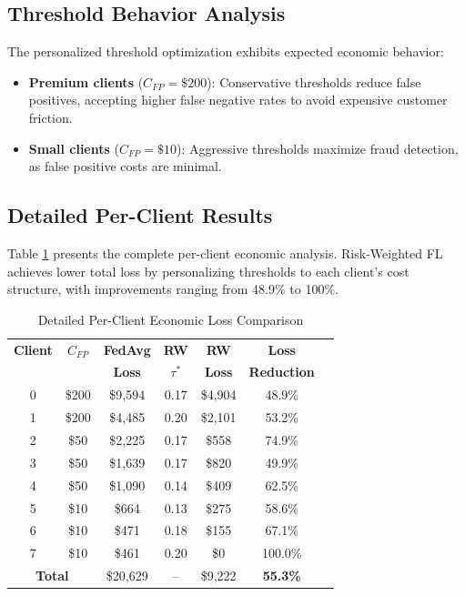 \documentclass[conference]{IEEEtran}
\begin{document}
\subsection{Threshold Behavior Analysis}

The personalized threshold optimization exhibits expected economic behavior:

\begin{itemize}
    \item \textbf{Premium clients} ($C_{FP}=\$200$): Conservative thresholds reduce false positives, accepting higher false negative rates to avoid expensive customer friction.
    \item \textbf{Small clients} ($C_{FP}=\$10$): Aggressive thresholds maximize fraud detection, as false positive costs are minimal.
\end{itemize}

\subsection{Detailed Per-Client Results}

Table \ref{tab:detailed_results} presents the complete per-client economic analysis. Risk-Weighted FL achieves lower total loss by personalizing thresholds to each client's cost structure, with improvements ranging from 48.9\% to 100\%.

\begin{table}[h]
\centering
\caption{Detailed Per-Client Economic Loss Comparison}
\label{tab:detailed_results}
\begin{tabular}{@{}ccccccc@{}}
\toprule
\textbf{Client} & \textbf{$C_{FP}$} & \textbf{FedAvg} & \textbf{RW} & \textbf{RW} & \textbf{Loss} \\
 & & \textbf{Loss} & \textbf{$\tau^*$} & \textbf{Loss} & \textbf{Reduction} \\
\midrule
0 & \$200 & \$9,594 & 0.17 & \$4,904 & 48.9\% \\
1 & \$200 & \$4,485 & 0.20 & \$2,101 & 53.2\% \\
2 & \$50 & \$2,225 & 0.17 & \$558 & 74.9\% \\
3 & \$50 & \$1,639 & 0.17 & \$820 & 49.9\% \\
4 & \$50 & \$1,090 & 0.14 & \$409 & 62.5\% \\
5 & \$10 & \$664 & 0.13 & \$275 & 58.6\% \\
6 & \$10 & \$471 & 0.18 & \$155 & 67.1\% \\
7 & \$10 & \$461 & 0.20 & \$0 & 100.0\% \\
\midrule
\multicolumn{2}{c}{\textbf{Total}} & \$20,629 & -- & \$9,222 & \textbf{55.3\%} \\
\bottomrule
\end{tabular}
\end{table}
\end{document}
